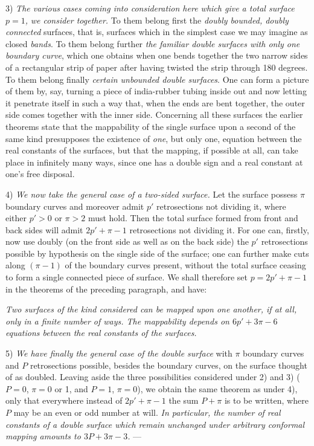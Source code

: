 \documentclass{article}
\begin{document}
3) \emph{The various cases coming into consideration here which give a total surface $p = 1$,} \emph{we consider together.} To them belong first the \emph{doubly bounded, doubly connected} surfaces, that is, surfaces which in the simplest case we may imagine as closed \emph{bands}. To them belong further \emph{the familiar double surfaces with only one boundary curve}, which one obtains when one bends together the two narrow sides of a rectangular strip of paper after having twisted the strip through 180 degrees. To them belong finally \emph{certain unbounded double surfaces}. One can form a picture of them by, say, turning a piece of india-rubber tubing inside out and now letting it penetrate itself in such a way that, when the ends are bent together, the outer side comes together with the inner side. Concerning all these surfaces the earlier theorems state that the mappability of the single surface upon a second of the same kind presupposes the existence of \emph{one}, but only one, equation between the real constants of the surfaces, but that the mapping, if possible at all, can take place in infinitely many ways, since one has a double sign and a real constant at one's free disposal.


4) \emph{We now take the general case of a two-sided surface.} Let the surface possess $\pi$ boundary curves and moreover admit $p'$ retrosections not dividing it, where either $p' > 0$ or $\pi > 2$ must hold. Then the total surface formed from front and back sides will admit $2p' + \pi - 1$ retrosections not dividing it. For one can, firstly, now use doubly (on the front side as well as on the back side) the $p'$ retrosections possible by hypothesis on the single side of the surface; one can further make cuts along $(\pi - 1)$ of the boundary curves present, without the total surface ceasing to form a single connected piece of surface. We shall therefore set $p = 2p' + \pi - 1$ in the theorems of the preceding paragraph, and have:

\emph{Two surfaces of the kind considered can be mapped upon one another, if at all, only in a finite number of ways. The mappability depends on $6p' + 3\pi - 6$ equations between the real constants of the surfaces.}

5) \emph{We have finally the general case of the double surface} with $\pi$ boundary curves and $P$ retrosections possible, besides the boundary curves, on the surface thought of as doubled. Leaving aside the three possibilities considered under 2) and 3) ($P = 0$, $\pi = 0$ or 1, and $P = 1$, $\pi = 0$), we obtain the same theorem as under 4), only that everywhere instead of $2p' + \pi - 1$ the sum $P + \pi$ is to be written, where $P$ may be an even or odd number at will. \emph{In particular, the number of real constants of a double surface which remain unchanged under arbitrary conformal mapping amounts to $3P + 3\pi - 3$.} ---
\end{document}
